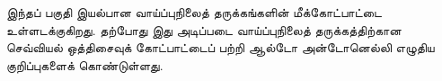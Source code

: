 \documentclass[../../include/open-logic-part]{subfiles}
\begin{document}

\begin{editorial}
  இந்தப் பகுதி இயல்பான வாய்ப்புநிலைத் தருக்கங்களின் மீக்கோட்பாட்டை
  உள்ளடக்குகிறது. தற்போது இது அடிப்படை வாய்ப்புநிலைத் தருக்கத்திற்கான
  செவ்வியல் ஒத்திசைவுக் கோட்பாட்டைப் பற்றி ஆல்டோ அன்டோனெல்லி எழுதிய
  குறிப்புகளைக் கொண்டுள்ளது.
\end{editorial}








\OLEndPartHook
\end{document}

